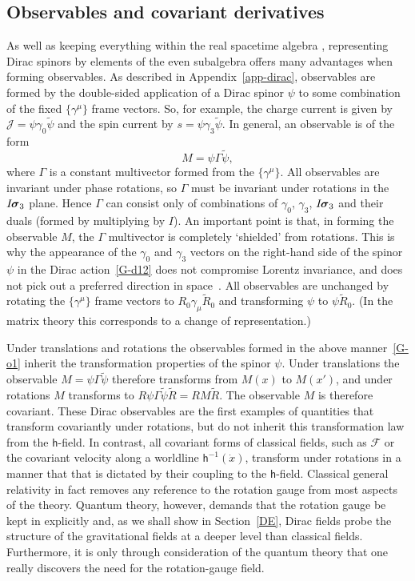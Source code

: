 \documentclass[a4paper]{article}
\numberwithin{equation}{section}
\newcommand{\eqv}{=}
\newcommand{\sig}{\mbox{\boldmath $\sigma$}}
\newcommand{\Gam}{\Gamma}
\newcommand{\bsig}{\mbox{\boldmath $\sig$}}
\newcommand{\clf}{{\mathcal{F}}}
\newcommand{\clj}{{\mathcal{J}}}
\newcommand{\isk}{I \hspace{-1pt} \bsig_3}
\newcommand{\gk}{\gamma_{3}}
\newcommand{\go}{\gamma_{0}}
\newcommand{\gamum}{\gamma^\mu}
\newcommand{\gamdm}{\gamma_\mu}
\newcommand{\Rrev}{\tilde{R}}
\newcommand{\psirev}{\tilde{\psi}}
\newcommand{\lih}{\mathsf{h}}
\newcommand{\hu}{\lih}
\begin{document}
\subsection{Observables and covariant derivatives}

As well as keeping everything within the real spacetime algebra ,
representing Dirac spinors by elements of the even subalgebra offers
many advantages when forming observables.  As described in
Appendix~\ref{app-dirac}, observables are formed by the double-sided
application of a Dirac spinor $\psi$ to some combination of the fixed
$\{\gamum\}$ frame vectors.  So, for example, the charge current is
given by $\clj\eqv\psi\go\psirev$ and the spin current by $s\eqv\psi
\gk\psirev$.  In general, an observable is of the form
%
\begin{equation}
M \eqv \psi \Gamma \psirev,
\label{G-o1}
\end{equation}
%
where $\Gamma$ is a constant multivector formed from the $\{\gamum\}$.
All observables are invariant under phase rotations, so $\Gamma$ must
be invariant under rotations in the $\isk$ plane.  Hence $\Gamma$ can
consist only of combinations of $\go$, $\gk$, $\isk$ and their duals
(formed by multiplying by $I$).  An important point is that, in
forming the observable $M$, the $\Gam$ multivector is completely
`shielded' from rotations.  This is why the appearance of the $\go$
and $\gk$ vectors on the right-hand side of the spinor $\psi$ in the
Dirac action~\eqref{G-d12} does not compromise Lorentz invariance, and
does not pick out a preferred direction in space~\cite{DGL93-states}.
All observables are unchanged by rotating the $\{\gamum\}$ frame
vectors to $R_0\gamdm\Rrev_0$ and transforming $\psi$ to
$\psi\Rrev_0$.  (In the matrix theory this corresponds to a change of
representation.)


Under translations and rotations the observables formed in the above
manner~\eqref{G-o1} inherit the transformation properties of the
spinor $\psi$.  Under translations the observable
$M=\psi\Gamma\psirev$ therefore transforms from $M(x)$ to $M(x')$, and
under rotations $M$ transforms to $R\psi\Gamma\psirev\Rrev=RM\Rrev$.
The observable $M$ is therefore covariant.  These Dirac observables
are the first examples of quantities that transform covariantly under
rotations, but do not inherit this transformation law from the
$\lih$-field.  In contrast, all covariant forms of classical fields,
such as $\clf$ or the covariant velocity along a worldline
$\hu^{-1}(\dot{x})$, transform under rotations in a manner that that
is dictated by their coupling to the $\lih$-field.  Classical general
relativity in fact removes any reference to the rotation gauge from
most aspects of the theory.  Quantum theory, however, demands that the
rotation gauge be kept in explicitly and, as we shall show in
Section~\ref{DE}, Dirac fields probe the structure of the
gravitational fields at a deeper level than classical fields.
Furthermore, it is only through consideration of the quantum theory
that one really discovers the need for the rotation-gauge field.
 
\end{document}
